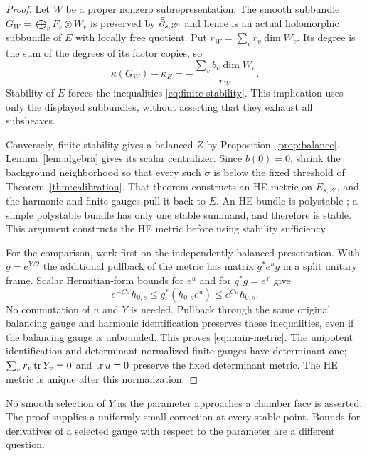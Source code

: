 \begin{proof}
Let $W$ be a proper nonzero subrepresentation. The smooth subbundle
$G_W=\bigoplus_vF_v\otimes W_v$ is preserved by
$\bar\partial_{s,Z^0}$ and hence is an actual holomorphic subbundle of $E$
with locally free quotient. Put $r_W=\sum_vr_v\dim W_v$.
Its degree is the sum of the degrees of its factor copies, so
\begin{equation}\label{eq:subbundle-slope}
\kappa(G_W)-\kappa_E
=-\frac{\sum_vb_v\dim W_v}{r_W}.
\end{equation}
Stability of $E$ forces the inequalities
\eqref{eq:finite-stability}. This implication uses only the
displayed subbundles, without asserting that they exhaust all
subsheaves.

Conversely, finite stability gives a balanced $Z$ by
Proposition~\ref{prop:balance}. Lemma~\ref{lem:algebra} gives
its scalar centralizer. Since $b(0)=0$, shrink the background
neighborhood so that every such $\sigma$ is below the fixed
threshold of Theorem~\ref{thm:calibration}. That theorem constructs
an HE metric on $E_{s,Z'}$, and the harmonic and finite gauges pull
it back to $E$. An HE bundle is polystable
\cite[Chapter~V]{kobayashi1987}; a simple polystable bundle has
only one stable summand, and therefore is stable. This argument
constructs the HE metric before using stability sufficiency.

For the comparison, work first on the independently balanced
presentation. With $g=e^{Y/2}$ the additional pullback of the
metric has matrix $g^*e^ug$ in a split unitary frame. Scalar
Hermitian-form bounds for $e^u$ and for $g^*g=e^Y$ give
\[
e^{-C\sigma}h_{0,s}\le g^*(h_{0,s}e^u)
\le e^{C\sigma}h_{0,s}.
\]
No commutation of $u$ and $Y$ is needed. Pullback through the
same original balancing gauge and harmonic identification
preserves these inequalities, even if the balancing gauge is
unbounded. This proves \eqref{eq:main-metric}. The unipotent
identification and determinant-normalized finite gauges have
determinant one; $\sum_vr_v\operatorname{tr} Y_v=0$ and $\operatorname{tr} u=0$ preserve
the fixed determinant metric. The HE metric is unique after
this normalization.
\end{proof}

No smooth selection of $Y$ as the parameter approaches a chamber
face is asserted. The proof supplies a uniformly small correction
at every stable point. Bounds for derivatives of a selected gauge
with respect to the parameter are a different question.
